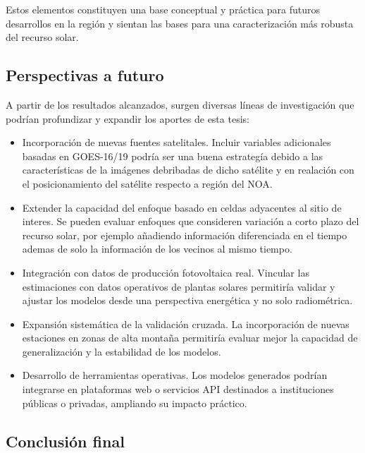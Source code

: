 Estos elementos constituyen una base conceptual y práctica para futuros desarrollos en la región y sientan las bases para una caracterización más robusta del recurso solar.



\subsection{Perspectivas a futuro}


A partir de los resultados alcanzados, surgen diversas líneas de investigación que podrían profundizar y expandir los aportes de esta tesis:

\begin{itemize}

\item Incorporación de nuevas fuentes satelitales. Incluir variables adicionales basadas en  GOES-16/19 podría ser una buena estrategía debido a las características de la imágenes debribadas de dicho satélite y en realación con el posicionamiento del satélite respecto a región del NOA.


\item Extender la capacidad del enfoque basado en celdas adyacentes al sitio de interes. Se pueden evaluar enfoques que consideren variación a corto plazo del recurso solar, por ejemplo añadiendo información diferenciada en el tiempo ademas de solo la información de los vecinos al mismo tiempo.


\item Integración con datos de producción fotovoltaica real.   Vincular las estimaciones con datos operativos de plantas solares permitiría validar y ajustar los modelos desde una perspectiva energética y no solo radiométrica.

\item Expansión sistemática de la validación cruzada. La incorporación de nuevas estaciones en zonas de alta montaña permitiría evaluar mejor la capacidad de generalización y la estabilidad de los modelos.

\item Desarrollo de herramientas operativas. Los modelos generados podrían integrarse en plataformas web o servicios API destinados a instituciones públicas o privadas, ampliando su impacto práctico.


\end{itemize}





\subsection{Conclusión final}

